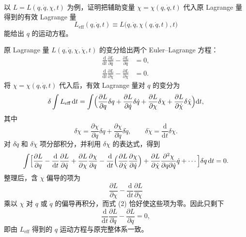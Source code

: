 


\begin{question}
以 \(L = L(q, \dot q, \chi, t)\) 为例，证明把辅助变量 \(\chi = \chi(q, \dot q, t)\) 代入原 Lagrange 量得到的有效 Lagrange 量
\[
L_{\text{eff}}(q,\dot q,t) \equiv L\bigl(q,\dot q,\chi(q,\dot q,t),t\bigr)
\]
能给出 \(q\) 的运动方程。
\begin{solution}
原 Lagrange 量 \(L(q,\dot q,\chi,\dot\chi,t)\) 的变分给出两个 Euler--Lagrange 方程：
\begin{align*}
\frac{\mathrm d}{\mathrm dt}\frac{\partial L}{\partial\dot q} - \frac{\partial L}{\partial q} &= 0, \tag{1}\\
\frac{\mathrm d}{\mathrm dt}\frac{\partial L}{\partial\dot\chi} - \frac{\partial L}{\partial\chi} &= 0. \tag{2}
\end{align*}
将 \(\chi = \chi(q,\dot q,t)\) 代入后，有效 Lagrange 量对 \(q\) 的变分为
\[
\delta\int L_{\text{eff}}\,\mathrm dt
= \int\Bigl(
\frac{\partial L}{\partial q}\delta q
+ \frac{\partial L}{\partial\dot q}\delta\dot q
+ \frac{\partial L}{\partial\chi}\delta\chi
+ \frac{\partial L}{\partial\dot\chi}\delta\dot\chi
\Bigr)\mathrm dt,
\]
其中
\[
\delta\chi = \frac{\partial\chi}{\partial q}\delta q + \frac{\partial\chi}{\partial\dot q}\delta\dot q,\qquad
\delta\dot\chi = \frac{\mathrm d}{\mathrm dt}\delta\chi .
\]
对 \(\delta\dot q\) 和 \(\delta\dot\chi\) 项分部积分，并利用 \(\delta\chi\) 的表达式，得到
\[
\int\Bigl[
\frac{\partial L}{\partial q} - \frac{\mathrm d}{\mathrm dt}\frac{\partial L}{\partial\dot q}
+ \frac{\partial L}{\partial\chi}\frac{\partial\chi}{\partial q}
- \frac{\mathrm d}{\mathrm dt}\Bigl(\frac{\partial L}{\partial\dot\chi}\frac{\partial\chi}{\partial\dot q}\Bigr)
+ \frac{\partial L}{\partial\dot\chi}\frac{\partial^2\chi}{\partial q\partial\dot q}\dot q
+ \cdots
\Bigr]\delta q\,\mathrm dt = 0 .
\]
整理后，含 \(\chi\) 偏导的项为
\[
\frac{\partial L}{\partial\chi} - \frac{\mathrm d}{\mathrm dt}\frac{\partial L}{\partial\dot\chi}
\]
乘以 \(\chi\) 对 \(q\) 或 \(\dot q\) 的偏导再积分，而式 (2) 恰好使这些项为零。因此只剩下
\[
\frac{\mathrm d}{\mathrm dt}\frac{\partial L}{\partial\dot q} - \frac{\partial L}{\partial q} = 0,
\]
即由 \(L_{\text{eff}}\) 得到的 \(q\) 运动方程与原完整体系一致。
\end{solution}
\end{question}

